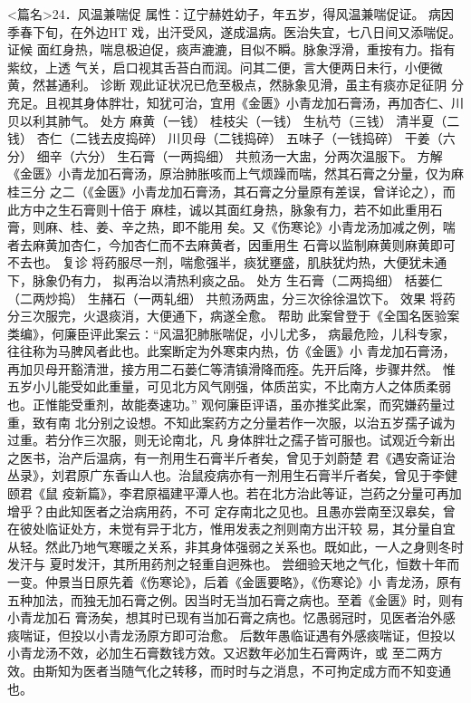 \documentclass[a4paper,12pt,UTF8,twoside]{ctexbook}
\begin{document}
<篇名>24．风温兼喘促
属性：辽宁赫姓幼子，年五岁，得风温兼喘促证。 
病因 季春下旬，在外边HT 戏，出汗受风，遂成温病。医治失宜，七八日间又添喘促。 
证候 面红身热，喘息极迫促，痰声漉漉，目似不瞬。脉象浮滑，重按有力。指有紫纹，上透 
气关，启口视其舌苔白而润。问其二便，言大便两日未行，小便微黄，然甚通利。 
诊断 观此证状况已危至极点，然脉象见滑，虽主有痰亦足征阴 
分充足。且视其身体胖壮，知犹可治，宜用《金匮》小青龙加石膏汤，再加杏仁、川贝以利其肺气。 
处方 麻黄（一钱） 桂枝尖（一钱） 生杭芍（三钱） 清半夏（二钱） 
杏仁（二钱去皮捣碎） 川贝母（二钱捣碎） 五味子（一钱捣碎） 干姜（六分） 
细辛（六分） 生石膏（一两捣细） 
共煎汤一大盅，分两次温服下。 
方解 《金匮》小青龙加石膏汤，原治肺胀咳而上气烦躁而喘，然其石膏之分量，仅为麻桂三分 
之二（《金匮》小青龙加石膏汤，其石膏之分量原有差误，曾详论之），而此方中之生石膏则十倍于 
麻桂，诚以其面红身热，脉象有力，若不如此重用石膏，则麻、桂、姜、辛之热，即不能用 
矣。又《伤寒论》小青龙汤加减之例，喘者去麻黄加杏仁，今加杏仁而不去麻黄者，因重用生 
石膏以监制麻黄则麻黄即可不去也。 
复诊 将药服尽一剂，喘愈强半，痰犹壅盛，肌肤犹灼热，大便犹未通下，脉象仍有力， 
拟再治以清热利痰之品。 
处方 生石膏（二两捣细） 栝蒌仁（二两炒捣） 生赭石（一两轧细） 
共煎汤两盅，分三次徐徐温饮下。 
效果 将药分三次服完，火退痰消，大便通下，病遂全愈。 
帮助 此案曾登于《全国名医验案类编》，何廉臣评此案云∶“风温犯肺胀喘促，小儿尤多， 
病最危险，儿科专家，往往称为马脾风者此也。此案断定为外寒束内热，仿《金匮》小 
青龙加石膏汤，再加贝母开豁清泄，接方用二石蒌仁等清镇滑降而痊。先开后降，步骤井然。 
惟五岁小儿能受如此重量，可见北方风气刚强，体质茁实，不比南方人之体质柔弱 
也。正惟能受重剂，故能奏速功。” 
观何廉臣评语，虽亦推奖此案，而究嫌药量过重，致有南 
北分别之设想。不知此案药方之分量若作一次服，以治五岁孺子诚为过重。若分作三次服，则无论南北，凡 
身体胖壮之孺子皆可服也。试观近今新出之医书，治产后温病，有一剂用生石膏半斤者矣，曾见于刘蔚楚 
君《遇安斋证治丛录》，刘君原广东香山人也。治鼠疫病亦有一剂用生石膏半斤者矣，曾见于李健颐君《鼠 
疫新篇》，李君原福建平潭人也。若在北方治此等证，岂药之分量可再加增乎？由此知医者之治病用药，不可 
定存南北之见也。且愚亦尝南至汉皋矣，曾在彼处临证处方，未觉有异于北方，惟用发表之剂则南方出汗较 
易，其分量自宜从轻。然此乃地气寒暖之关系，非其身体强弱之关系也。既如此，一人之身则冬时发汗与 
夏时发汗，其所用药剂之轻重自迥殊也。 
尝细验天地之气化，恒数十年而一变。仲景当日原先着《伤寒论》，后着《金匮要略》，《伤寒论》小 
青龙汤，原有五种加法，而独无加石膏之例。因当时无当加石膏之病也。至着《金匮》时，则有小青龙加石 
膏汤矣，想其时已现有当加石膏之病也。忆愚弱冠时，见医者治外感痰喘证，但投以小青龙汤原方即可治愈。 
后数年愚临证遇有外感痰喘证，但投以小青龙汤不效，必加生石膏数钱方效。又迟数年必加生石膏两许，或 
至二两方效。由斯知为医者当随气化之转移，而时时与之消息，不可拘定成方而不知变通也。 
\end{document}
